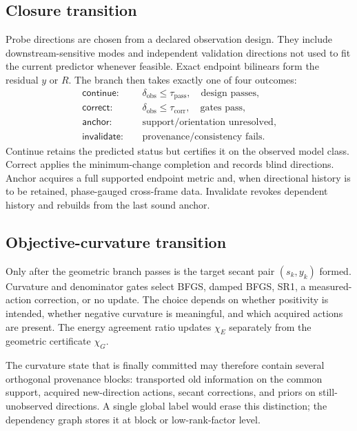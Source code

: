 \documentclass[10pt,twocolumn]{article}
\theoremstyle{definition}
\theoremstyle{remark}
\begin{document}
\subsection{Closure transition}

Probe directions are chosen from a declared observation design.  They include
downstream-sensitive modes and independent validation directions not used to
fit the current predictor whenever feasible.  Exact endpoint bilinears form
the residual $y$ or $R$.  The branch then takes exactly one of four outcomes:
\begin{align}
 \mathsf{continue}:&\quad
 \delta_{\mathrm{obs}}\le\tau_{\mathrm{pass}},
 \quad\text{design passes},\nonumber\\
 \mathsf{correct}:&\quad
 \delta_{\mathrm{obs}}\le\tau_{\mathrm{corr}},
 \quad\text{gates pass},\nonumber\\
 \mathsf{anchor}:&\quad
 \text{support/orientation unresolved},\nonumber\\
 \mathsf{invalidate}:&\quad
 \text{provenance/consistency fails}.
 \label{eq:appprotocolbranches}
\end{align}
Continue retains the predicted status but certifies it on the observed model
class.  Correct applies the minimum-change completion and records blind
directions.  Anchor acquires a full supported endpoint metric and, when
directional history is to be retained, phase-gauged cross-frame data.
Invalidate revokes dependent history and rebuilds from the last sound anchor.

\subsection{Objective-curvature transition}

Only after the geometric branch passes is the target secant pair
$(s_k,y_k)$ formed.  Curvature and denominator gates select BFGS, damped
BFGS, SR1, a measured-action correction, or no update.  The choice depends on
whether positivity is intended, whether negative curvature is meaningful, and
which acquired actions are present.  The energy agreement ratio updates
$\chi_E$ separately from the geometric certificate $\chi_G$.

The curvature state that is finally committed may therefore contain several
orthogonal provenance blocks: transported old information on the common
support, acquired new-direction actions, secant corrections, and priors on
still-unobserved directions.  A single global label would erase this
distinction; the dependency graph stores it at block or low-rank-factor level.
\end{document}
